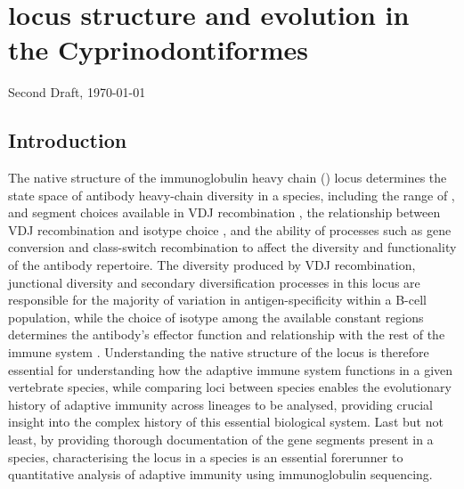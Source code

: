 
\chapter{\igh{} locus structure and evolution in the Cyprinodontiformes}  
\label{chap:locus}
\onehalfspacing

\ifdefineChapter
	{\LARGE Second Draft, \today}
\fi

\pagebreak


\section{Introduction} %

The native structure of the immunoglobulin heavy chain (\igh{}) locus determines the state space of antibody heavy-chain diversity in a species, including the range of \vh, \dh and \jh segment choices available in VDJ recombination \parencite{jung2006vdjr}, the relationship between VDJ recombination and isotype choice \parencite{fillatreau2013astonishing}, and the ability of processes such as gene conversion \parencite{wysocki1989conversion} and class-switch recombination \parencite{magor2015affinity,patel2018aid} to affect the diversity and functionality of the antibody repertoire. The diversity produced by VDJ recombination, junctional diversity and secondary diversification processes in this locus are responsible for the majority of variation in antigen-specificity within a B-cell population, while the choice of isotype among the available \igh{} constant regions determines the antibody's effector function and relationship with the rest of the immune system \parencite{schroeder2010immunoglobulins}. Understanding the native structure of the \igh{} locus is therefore essential for understanding how the adaptive immune system functions in a given vertebrate species, while comparing loci between species enables the evolutionary history of adaptive immunity across lineages to be analysed, providing crucial insight into the complex history of this essential biological system. Last but not least, by providing thorough documentation of the \igh{} gene segments present in a species, characterising the \igh{} locus in a species is an essential forerunner to quantitative analysis of adaptive immunity using immunoglobulin sequencing.

